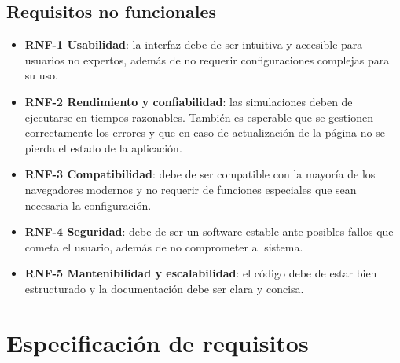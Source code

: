 \subsection{Requisitos no funcionales}
\label{subsec:RequisitosNoFuncionales}
\begin{itemize}
    \item \textbf{RNF-1 Usabilidad}: la interfaz debe de ser intuitiva y accesible para usuarios no expertos, además de no requerir configuraciones complejas para su uso.
    \item \textbf{RNF-2 Rendimiento y confiabilidad}: las simulaciones deben de ejecutarse en tiempos razonables. También es esperable que se gestionen correctamente los errores y que en caso de actualización de la página no se pierda el estado de la aplicación.
    \item \textbf{RNF-3 Compatibilidad}: debe de ser compatible con la mayoría de los navegadores modernos y no requerir de funciones especiales que sean necesaria la configuración.
    \item \textbf{RNF-4 Seguridad}: debe de ser un software estable ante posibles fallos que cometa el usuario, además de no comprometer al sistema.
    \item \textbf{RNF-5 Mantenibilidad y escalabilidad}: el código debe de estar bien estructurado y la documentación debe ser clara y concisa.
\end{itemize}

\section{Especificación de requisitos}
\label{sec:EspecificacionRequisitos}

\newpage

